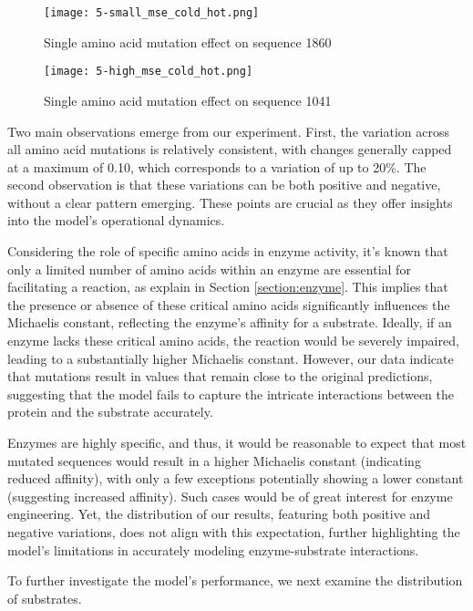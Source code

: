 \begin{figure}
    \centering
    \texttt{[image: 5-small\_mse\_cold\_hot.png]}
    \caption{Single amino acid mutation effect on sequence 1860}
    \label{fig:seq1860}
  \end{figure}

\begin{figure}
    \centering
    \texttt{[image: 5-high\_mse\_cold\_hot.png]}
    \caption{Single amino acid mutation effect on sequence 1041}
    \label{fig:seq1866}
  \end{figure}

Two main observations emerge from our experiment. First, the variation across all amino acid mutations is relatively consistent, with changes generally capped at a maximum of 0.10, which corresponds to a variation of up to 20\%. The second observation is that these variations can be both positive and negative, without a clear pattern emerging. These points are crucial as they offer insights into the model's operational dynamics.

Considering the role of specific amino acids in enzyme activity, it's known that only a limited number of amino acids within an enzyme are essential for facilitating a reaction, as explain in Section \ref{section:enzyme}. This implies that the presence or absence of these critical amino acids significantly influences the Michaelis constant, reflecting the enzyme's affinity for a substrate. Ideally, if an enzyme lacks these critical amino acids, the reaction would be severely impaired, leading to a substantially higher Michaelis constant. However, our data indicate that mutations result in values that remain close to the original predictions, suggesting that the model fails to capture the intricate interactions between the protein and the substrate accurately.
  
Enzymes are highly specific, and thus, it would be reasonable to expect that most mutated sequences would result in a higher Michaelis constant (indicating reduced affinity), with only a few exceptions potentially showing a lower constant (suggesting increased affinity). Such cases would be of great interest for enzyme engineering. Yet, the distribution of our results, featuring both positive and negative variations, does not align with this expectation, further highlighting the model's limitations in accurately modeling enzyme-substrate interactions.
  
To further investigate the model's performance, we next examine the distribution of substrates.

